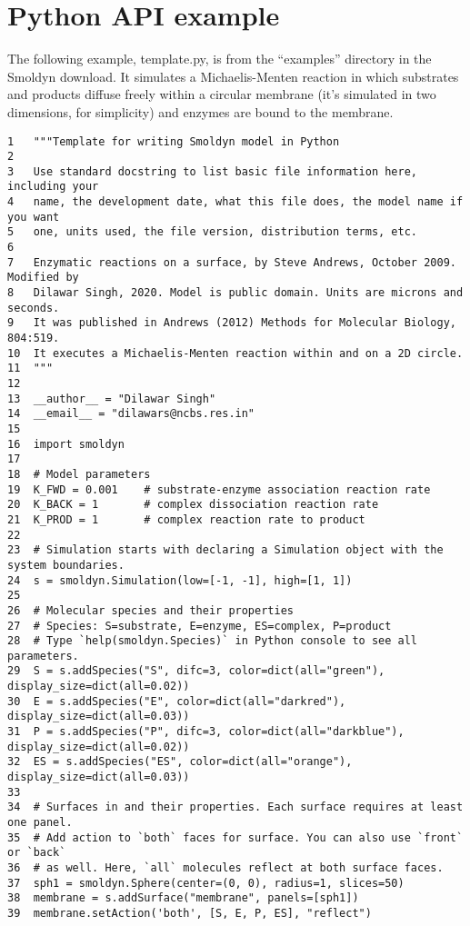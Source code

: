 \documentclass {scrbook}
\begin{document}
\section{Python API example}

The following example, template.py, is from the ``examples'' directory in the Smoldyn download. It simulates a Michaelis-Menten reaction in which substrates and products diffuse freely within a circular membrane (it's simulated in two dimensions, for simplicity) and enzymes are bound to the membrane.

\begin{lstlisting}[style=SSAPython]
1   """Template for writing Smoldyn model in Python
2
3   Use standard docstring to list basic file information here, including your
4   name, the development date, what this file does, the model name if you want
5   one, units used, the file version, distribution terms, etc.
6
7   Enzymatic reactions on a surface, by Steve Andrews, October 2009. Modified by
8   Dilawar Singh, 2020. Model is public domain. Units are microns and seconds.
9   It was published in Andrews (2012) Methods for Molecular Biology, 804:519.
10  It executes a Michaelis-Menten reaction within and on a 2D circle.
11  """
12
13  __author__ = "Dilawar Singh"
14  __email__ = "dilawars@ncbs.res.in"
15
16  import smoldyn
17
18  # Model parameters
19  K_FWD = 0.001    # substrate-enzyme association reaction rate
20  K_BACK = 1       # complex dissociation reaction rate
21  K_PROD = 1       # complex reaction rate to product
22
23  # Simulation starts with declaring a Simulation object with the system boundaries.
24  s = smoldyn.Simulation(low=[-1, -1], high=[1, 1])
25
26  # Molecular species and their properties
27  # Species: S=substrate, E=enzyme, ES=complex, P=product
28  # Type `help(smoldyn.Species)` in Python console to see all parameters.
29  S = s.addSpecies("S", difc=3, color=dict(all="green"), display_size=dict(all=0.02))
30  E = s.addSpecies("E", color=dict(all="darkred"), display_size=dict(all=0.03))
31  P = s.addSpecies("P", difc=3, color=dict(all="darkblue"), display_size=dict(all=0.02))
32  ES = s.addSpecies("ES", color=dict(all="orange"), display_size=dict(all=0.03))
33
34  # Surfaces in and their properties. Each surface requires at least one panel.
35  # Add action to `both` faces for surface. You can also use `front` or `back`
36  # as well. Here, `all` molecules reflect at both surface faces.
37  sph1 = smoldyn.Sphere(center=(0, 0), radius=1, slices=50)
38  membrane = s.addSurface("membrane", panels=[sph1])
39  membrane.setAction('both', [S, E, P, ES], "reflect")

\end{lstlisting}
\end{document}

